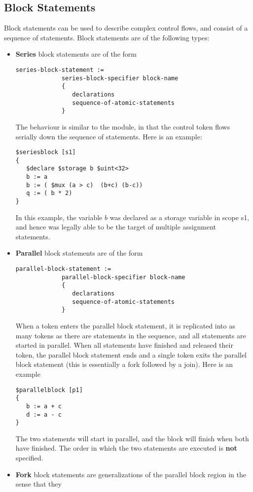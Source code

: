 \documentclass{article}
\begin{document}
\subsection{Block Statements}

Block statements can be used to describe complex
control flows, and consist of a sequence of statements.
Block statements are of
the following types:
\begin{itemize}
\item {\bf Series} block statements are of the form
\begin{verbatim}
series-block-statement :=
             series-block-specifier block-name
             { 
                declarations
                sequence-of-atomic-statements
             }
\end{verbatim}
The behaviour is similar to the module, in that the control
token flows serially down the sequence of statements.
Here is an example:
\begin{verbatim}
$seriesblock [s1] 
{
   $declare $storage b $uint<32>
   b := a
   b := ( $mux (a > c)  (b+c) (b-c))
   q := ( b * 2)
}
\end{verbatim}
In this example, the variable $b$ was declared as
a storage variable in scope s1, and hence was legally
able to be the target of multiple assignment statements.
\item {\bf Parallel} block statements are of the form
\begin{verbatim}
parallel-block-statement :=
             parallel-block-specifier block-name
             { 
                declarations
                sequence-of-atomic-statements
             }
\end{verbatim}
When a token enters the parallel block statement, it
is replicated into as many tokens as there are statements in
the sequence, and all statements are started in parallel.
When all statements have finished and released their token,
the parallel block statement
ends and a single token exits the parallel block statement (this
is essentially a fork followed by a join).
Here is an example
\begin{verbatim}
$parallelblock [p1] 
{
   b := a + c
   d := a - c
}
\end{verbatim}
The two statements will start in parallel, and the block 
will finish when both have finished.  The
order in which the two statements are executed
is {\bf not} specified.
\item {\bf Fork} block statements are generalizations of the
parallel block region in the sense that they

\end{itemize}
\end{document}
